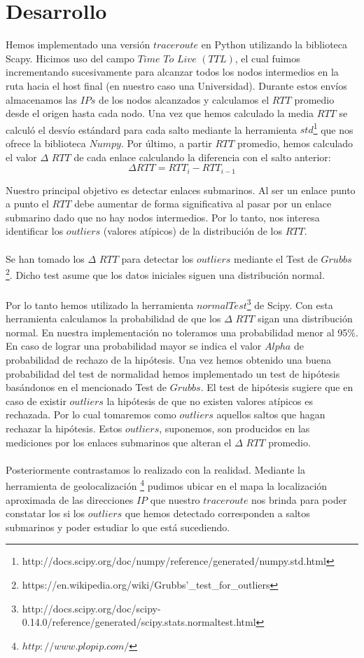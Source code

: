 \section{Desarrollo}

Hemos implementado una versión $traceroute$ en Python utilizando la biblioteca Scapy. 
Hicimos uso del campo $Time$ $To$ $Live$ $(TTL)$, el cual fuimos incrementando sucesivamente para alcanzar todos los nodos intermedios en la ruta 
hacia el host final (en nuestro caso una Universidad). 
Durante estos envíos almacenamos las $IPs$ de los nodos alcanzados y calculamos el $RTT$ promedio desde el origen hasta cada nodo. 
Una vez que hemos calculado la media $RTT$ se calculó el desvío estándard para cada salto mediante la herramienta $std$\footnote{http://docs.scipy.org/doc/numpy/reference/generated/numpy.std.html} 
que nos ofrece la biblioteca $Numpy$.
Por último, a partir $RTT$ promedio, hemos calculado el valor $\Delta$ $RTT$ de cada enlace calculando la diferencia con el salto anterior:
\begin{equation}
 \Delta RTT = RTT_{i} - RTT_{i-1}
\end{equation}

Nuestro principal objetivo es detectar enlaces submarinos. Al ser un enlace punto a punto el $RTT$ debe aumentar de forma significativa al 
pasar por un enlace submarino dado que no hay nodos intermedios. Por lo tanto, nos interesa identificar los $outliers$ (valores atípicos) de la distribución de los $RTT$.\\\\ 
Se han tomado los $\Delta$ $RTT$ para detectar los $outliers$ mediante el Test de $Grubbs$\footnote{https://en.wikipedia.org/wiki/Grubbs'\_test\_for\_outliers}. 
Dicho test asume que los datos iniciales siguen una distribución normal.\\\\ 
Por lo tanto hemos utilizado la herramienta $normalTest$\footnote{http://docs.scipy.org/doc/scipy-0.14.0/reference/generated/scipy.stats.normaltest.html} de Scipy. 
Con esta herramienta calculamos la probabilidad de que los $\Delta$ $RTT$ sigan una distribución normal. En nuestra implementación
no toleramos una probabilidad menor al 95\%. En caso de lograr una probabilidad mayor se indica el valor $Alpha$ de probabilidad de rechazo de la hipótesis.
Una vez hemos obtenido una buena probabilidad del test de normalidad hemos implementado un test de hipótesis basándonos en el mencionado Test de $Grubbs$. 
El test de hipótesis sugiere que en caso de existir $outliers$ la hipótesis de que no existen valores atípicos es rechazada. 
Por lo cual tomaremos como $outliers$ aquellos saltos que hagan rechazar la hipótesis. Estos $outliers$, suponemos, son producidos en las mediciones 
por los enlaces submarinos que alteran el $\Delta$ $RTT$ promedio.\\\\
Posteriormente contrastamos lo realizado con la realidad. Mediante la herramienta de geolocalización \footnote{$http://www.plopip.com/$} pudimos 
ubicar en el mapa la localización aproximada de las direcciones $IP$ que nuestro $traceroute$ nos brinda para poder constatar los si los $outliers$ 
que hemos detectado corresponden a saltos submarinos y poder estudiar lo que está sucediendo.
